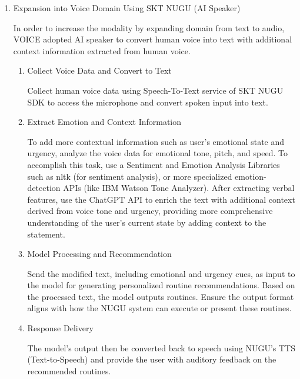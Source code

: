 \documentclass[conference]{IEEEtran}
\begin{document}
\begin{enumerate}[label=\arabic*]
    \vspace{1em}

    \item Expansion into Voice Domain Using SKT NUGU (AI Speaker)\par
    \vspace{0.3em}
    In order to increase the modality by expanding domain from text to audio, VOICE adopted AI speaker to convert human voice into text with additional context information extracted from human voice. 
    \vspace{0.3em}

    \begin{enumerate}[label=\arabic*)] 
        \item Collect Voice Data and Convert to Text\par
        \vspace{0.3em}
        Collect human voice data using Speech-To-Text service of SKT NUGU SDK to access the microphone and convert spoken input into text.

        \vspace{0.5em}

        \item Extract Emotion and Context Information\par
        \vspace{0.3em}
        To add more contextual information such as user’s emotional state and urgency, analyze the voice data for emotional tone, pitch, and speed. To accomplish this task, use a Sentiment and Emotion Analysis Libraries such as nltk (for sentiment analysis), or more specialized emotion-detection APIs (like IBM Watson Tone Analyzer). After extracting verbal features, use the ChatGPT API to enrich the text with additional context derived from voice tone and urgency, providing more comprehensive understanding of the user's current state by adding context to the statement.

        \vspace{0.5em}

        \item Model Processing and Recommendation\par
        \vspace{0.3em}
        Send the modified text, including emotional and urgency cues, as input to the model for generating personalized routine recommendations. Based on the processed text, the model outputs routines. Ensure the output format aligns with how the NUGU system can execute or present these routines.

        \vspace{0.5em}

        \item Response Delivery\par
        \vspace{0.3em}
        The model’s output then be converted back to speech using NUGU’s TTS (Text-to-Speech) and provide the user with auditory feedback on the recommended routines. 
    \end{enumerate}
\end{enumerate}
\end{document}
